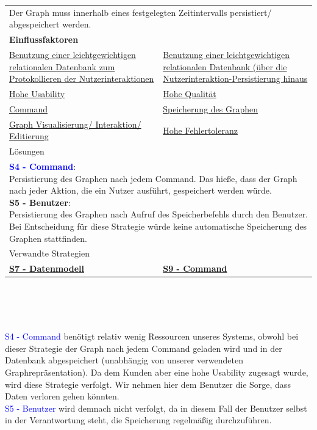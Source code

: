 \documentclass[enabledeprecatedfontcommands,fontsize=11pt,paper=a4,twoside]{scrartcl}
\newcounter{one}
\newcounter{two}[one]
\newcommand{\cb}[1]{{\textcolor{blue}{#1}}}
\begin{document}
	\newpage
	\begin{tabular} {|p{8cm} p{8cm}|}
		\hline
		\rowcolor{prob}\multicolumn{2}{|l|}{\parbox{16cm}{\textbf{02: Persistierungsintervall des Graphen}}} \\  \hline\hline 
		\multicolumn{2}{|l|}{\parbox{16cm}{Der Graph muss innerhalb eines festgelegten Zeitintervalls persistiert/ abgespeichert werden.}}\rule{0pt}{1ex}\\  \hline
		\multicolumn{2}{|l|}{\textbf{Einflussfaktoren}}\\
		\hyperlink {d}{Benutzung einer leichtgewichtigen relationalen Datenbank zum Protokollieren der Nutzerinteraktionen}&
		\hyperlink {e}{Benutzung einer leichtgewichtigen relationalen Datenbank (über die Nutzerinteraktion-Persistierung hinaus}\\
		\hyperlink {g}{Hohe Usability}&
		\hyperlink {h}{Hohe Qualität}\\
		\hyperlink {i}{Command} & 
		\hyperlink {v}{Speicherung des Graphen} \\
		\hyperlink {aa}{Graph Visualisierung/ Interaktion/ Editierung}  &  
		\hyperlink {tt}{Hohe Fehlertoleranz}    \\
		\hline
		\multicolumn{2}{|l|}{Lösungen} \\
		\multicolumn{2}{|l|}{\parbox{16cm}{
				\textbf{\cb{\hypertarget{zz}{S4 - Command}}}: \\
				Persistierung des Graphen nach jedem Command. Das hieße, dass der Graph nach jeder Aktion, die ein Nutzer ausführt, gespeichert werden würde. \\
				\textbf{S5 - Benutzer}: \\
				Persistierung des Graphen nach Aufruf des Speicherbefehls durch den Benutzer. Bei Entscheidung für diese Strategie würde keine automatische Speicherung des Graphen stattfinden.
		} }\\ [6ex] \hline
		\multicolumn{2}{|l|}{Verwandte Strategien} \\
		\textbf{\hyperlink {aaa}{S7 - Datenmodell}} &
		\textbf{\hyperlink {command}{S9 - Command}}
		\\\hline
	\end{tabular}\\ \\ \\
	\begin{onehalfspace}
		\cb{S4 - Command} benötigt relativ wenig Ressourcen unseres Systems, obwohl bei dieser Strategie der Graph nach jedem Command geladen wird und in der Datenbank abgespeichert (unabhängig von unserer verwendeten Graphrepräsentation).
		Da dem Kunden aber eine hohe Usability zugesagt wurde, wird diese Strategie verfolgt. Wir nehmen hier dem Benutzer die Sorge, dass Daten verloren gehen könnten. \\
		\cb{S5 - Benutzer} wird demnach nicht verfolgt, da in diesem Fall der Benutzer selbst in der Verantwortung steht, die Speicherung regelmäßig durchzuführen. \\
	\end{onehalfspace}
\end{document}
